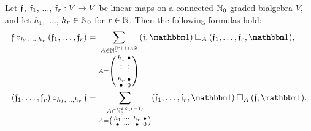 \documentclass[\MainFolder/Text.tex]{subfiles}
\begin{document}
\begin{Proposition}\label{Prop:PartCompAComp}
Let $\mathfrak{f}$, $\mathfrak{f}_1$, $\dotsc$, $\mathfrak{f}_r : V \rightarrow V$ be linear maps on a connected $\mathbb{N}_0$-graded bialgebra $V$, and let $h_1$,~$\dotsc$, $h_r \in \mathbb{N}_0$ for $r\in \mathbb{N}$. Then the following formulas hold:
\begin{align*}
\MVMorF\circ_{h_1, \dotsc, h_r}(\MVMorF_1, \dotsc, \MVMorF_r) &= \sum_{\substack{A \in \N_0^{(r+1)\times 2} \\ A = \left(\begin{smallmatrix}
h_1 & \bullet \\
\vphantom{\int\limits^x}\smash{\vdots} &  \smash{\vdots} \\
h_r & \bullet \\ 
\bullet & 0
\end{smallmatrix}\right)}} (\MVMorF,\Id)\SquareComp_{A}(\MVMorF_1,\dotsc,\MVMorF_r,\Id), \\
(\MVMorF_1, \dotsc, \MVMorF_r)\circ_{h_1, \dotsc, h_r}\MVMorF &= \sum_{\substack{A \in \N_0^{2\times(r+1)} \\ A = \left(\begin{smallmatrix}
h_1 & \dotsb & h_r & \bullet \\
\bullet & \dotsb & \bullet & 0
\end{smallmatrix}\right)
}} (\MVMorF_1,\dotsc,\MVMorF_r,\Id)\SquareComp_A(\MVMorF,\Id).
\end{align*}
\end{Proposition}
\end{document}
